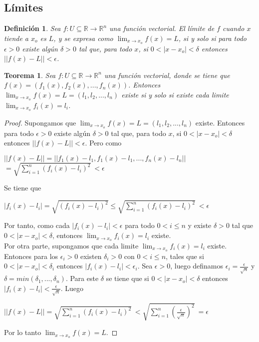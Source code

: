 \documentclass{book}
\newtheorem{theorem}{Teorema}[section]
\newtheorem{definition}{Definición}[section]
\begin{document}
\subsection{Límites}
\begin{definition}
Sea $f:U \subseteq \mathbb{R} \rightarrow \mathbb{R}^n$ una función vectorial. El límite de $f$ cuando $x$ tiende a $x_o$ es $L$, y se expresa como $\displaystyle \lim_{x \to x_o}f(x)=L$, si y solo si para todo $\epsilon > 0$ existe algún $\delta > 0$ tal que, para todo $x$, si $0<|x-x_o|<\delta$ entonces $||f(x)-L||<\epsilon$.
\end{definition}
\begin{theorem}
Sea $f:U \subseteq \mathbb{R} \rightarrow \mathbb{R}^n$ una función vectorial, donde se tiene que $f(x)=(f_1(x),f_2(x),...,f_n(x))$. Entonces $\displaystyle \lim_{x \to x_o}f(x)=L=(l_1,l_2,...,l_n)$ existe si y solo si existe cada limite $\displaystyle \lim_{x \to x_o}f_i(x)=l_i$.
\end{theorem}
\begin{proof}
 Supongamos que $\displaystyle \lim_{x \to x_o}f(x)=L=(l_1,l_2,...,l_n)$ existe. Entonces para todo $\epsilon > 0$ existe algún $\delta > 0$ tal que, para todo $x$, si $0<|x-x_o|<\delta$ entonces $||f(x)-L||<\epsilon$. Pero como 
 
 \begin{center}
    $||f(x)-L||=||f_1(x)-l_1, f_1(x)-l_1,...,f_n(x)-l_n||$ \\[1\baselineskip]
    $\displaystyle = \sqrt{\sum_{i=1}^{n}(f_i(x)-l_i)^2} \ <\epsilon$
\end{center}

Se tiene que 

 \begin{center}
    $|f_i(x)-l_i|=\sqrt{(f_i(x)-l_i)^2}\leq \displaystyle \sqrt{\sum_{i=1}^{n}(f_i(x)-l_i)^2}$$\ <\epsilon$
\end{center}

Por tanto, como cada $|f_i(x)-l_i|<\epsilon$ para todo $0<i\leq n$ y existe $\delta > 0$ tal que $0<|x-x_o|<\delta$, entonces $\displaystyle \lim_{x \to x_o}f_i(x)=l_i$ existe.
\\[1\baselineskip]
Por otra parte, supongamos que cada limite $\displaystyle \lim_{x \to x_o}f_i(x)=l_i$ existe. Entonces para los $\epsilon_i >0$ existen $\delta_i >0$ con $0<i\leq n$, tales que si $0<|x-x_o|<\delta_i$ entonces $|f_i(x)-l_i|<\epsilon_i$. Sea $\epsilon >0$, luego definamos $\epsilon_i =\frac{\epsilon}{\sqrt{n}}$ y $\delta=min(\delta_1,...,\delta_n)$. Para este $\delta$ se tiene que si $0<|x-x_o|<\delta$ entonces $|f_i(x)-l_i|<\frac{\epsilon}{\sqrt{n}}$. Luego

\begin{center}
       $||f(x)-L||=\displaystyle \sqrt{\sum_{i=1}^{n}(f_i(x)-l_i)^2}$$\displaystyle\ < \sqrt{\sum_{i=1}^{n}(\frac{\epsilon}{\sqrt{n}})^2}$$\ =\epsilon$
\end{center}

Por lo tanto $\displaystyle \lim_{x \to x_o}f(x)=L$.
\end{proof}
\end{document}
